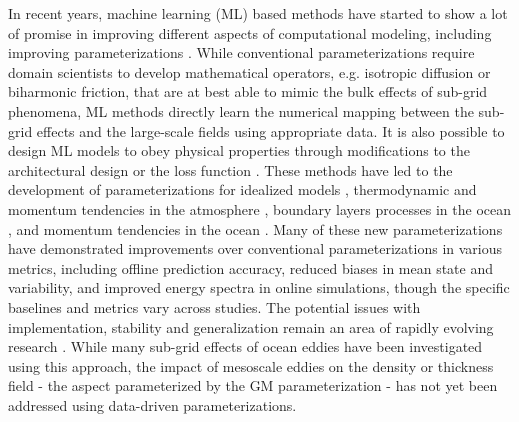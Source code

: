 \documentclass[draft]{agujournal2019}
\begin{document}
In recent years, machine learning (ML) based methods have started to show a lot of promise in improving different aspects of computational modeling, including improving parameterizations \cite{bracco2025machine, lai2024machine}. While conventional parameterizations require domain scientists to develop mathematical operators, e.g. isotropic diffusion or biharmonic friction, that are at best able to mimic the bulk effects of sub-grid phenomena, ML methods directly learn the numerical mapping between the sub-grid effects and the large-scale fields using appropriate data. It is also possible to design ML models to obey physical properties through modifications to the architectural design or the loss function \cite{beucler2021enforcing, zanna2020data}. These methods have led to the development of parameterizations for idealized models \cite{ross2023benchmarking, srinivasan2023turbulence}, thermodynamic and momentum tendencies in the atmosphere \cite{brenowitz2018prognostic, yuval2021use}, boundary layers processes in the ocean \cite{sane2023parameterizing, ramadhan2020capturing, bodner2023data}, and momentum tendencies in the ocean \cite{zhang2023implementation, zanna2020data, perezhogin2024stable}. Many of these new parameterizations have demonstrated improvements over conventional parameterizations in various metrics, including offline prediction accuracy, reduced biases in mean state and variability, and improved energy spectra in online simulations, though the specific baselines and metrics vary across studies. The potential issues with implementation, stability and generalization remain an area of rapidly evolving research \cite{zanna2025framework}.  
While many sub-grid effects of ocean eddies have been investigated using this approach, the impact of mesoscale eddies on the density or thickness field - the aspect parameterized by the GM parameterization - has not yet been addressed using data-driven parameterizations. 
\end{document}
